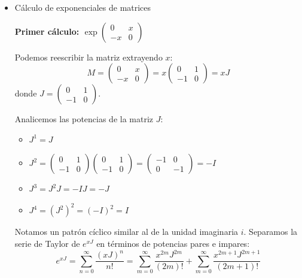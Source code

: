 \documentclass[11pt,spanish]{article}
\begin{document}
\begin{itemize}
Sustituimos esto en la serie original:
$$e^{A+B} = \sum_{n=0}^{\infty} \frac{1}{n!} \sum_{k=0}^{n} \frac{n!}{k!(n-k)!} A^k B^{n-k} = \sum_{n=0}^{\infty} \sum_{k=0}^{n} \frac{A^k}{k!} \frac{B^{n-k}}{(n-k)!}$$

Igual que en el inciso anterior, reconocemos aquí el producto de Cauchy de las series correspondientes a $e^A$ y $e^B$. Desacoplando las sumatorias:
$$e^{A+B} = \left( \sum_{k=0}^{\infty} \frac{A^k}{k!} \right) \left( \sum_{m=0}^{\infty} \frac{B^m}{m!} \right) = e^A e^B$$
Lo cual concluye la demostración.

\item Cálculo de exponenciales de matrices

{\bf Primer cálculo: $\exp\begin{pmatrix}0 & x \\ -x & 0\end{pmatrix}$}

Podemos reescribir la matriz extrayendo $x$:
$$M = \begin{pmatrix} 0 & x \\ -x & 0 \end{pmatrix} = x \begin{pmatrix} 0 & 1 \\ -1 & 0 \end{pmatrix} = x J$$
donde $J = \begin{pmatrix} 0 & 1 \\ -1 & 0 \end{pmatrix}$. 

Analicemos las potencias de la matriz $J$:
\begin{itemize}
\item  $J^1 = J$
\item  $J^2 = \begin{pmatrix} 0 & 1 \\ -1 & 0 \end{pmatrix} \begin{pmatrix} 0 & 1 \\ -1 & 0 \end{pmatrix} = \begin{pmatrix} -1 & 0 \\ 0 & -1 \end{pmatrix} = -I$
\item  $J^3 = J^2 J = -I J = -J$
\item $J^4 = (J^2)^2 = (-I)^2 = I$
\end{itemize}

Notamos un patrón cíclico similar al de la unidad imaginaria $i$. Separamos la serie de Taylor de $e^{xJ}$ en términos de potencias pares e impares:
$$e^{xJ} = \sum_{n=0}^{\infty} \frac{(xJ)^n}{n!} = \sum_{m=0}^{\infty} \frac{x^{2m} J^{2m}}{(2m)!} + \sum_{m=0}^{\infty} \frac{x^{2m+1} J^{2m+1}}{(2m+1)!}$$


\end{itemize}
\end{document}
